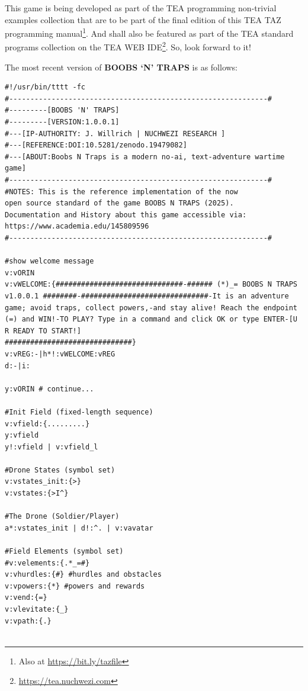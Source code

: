 \documentclass[a4paper, 18pt]{book} %
\begin{document}
\vspace{1em}

This game is being developed as part of the TEA programming non-trivial examples collection that are to be part of the final edition of this TEA TAZ programming manual\footnote{Also at \url{https://bit.ly/tazfile}}. And shall also be featured as part of the TEA standard programs collection on the TEA WEB IDE\footnote{\url{https://tea.nuchwezi.com}}. So, look forward to it!


The most recent version of \textbf{BOOBS `N' TRAPS} is as follows:
 

 {
 \small
  \begin{tcolorbox}[teaterminalstyle, title=TEA Program: BOOBS N TRAPS v1.0.0.1, breakable]
  \begin{lstlisting}[language=TEA,breaklines=true]
#!/usr/bin/tttt -fc
#-------------------------------------------------------------#
#---------[BOOBS 'N' TRAPS]
#---------[VERSION:1.0.0.1]
#---[IP-AUTHORITY: J. Willrich | NUCHWEZI RESEARCH ]
#---[REFERENCE:DOI:10.5281/zenodo.19479082]
#---[ABOUT:Boobs N Traps is a modern no-ai, text-adventure wartime game]
#-------------------------------------------------------------#
#NOTES: This is the reference implementation of the now 
open source standard of the game BOOBS N TRAPS (2025). 
Documentation and History about this game accessible via:
https://www.academia.edu/145809596
#-------------------------------------------------------------#

#show welcome message
v:vORIN
v:vWELCOME:{##############################-###### (*)_= BOOBS N TRAPS v1.0.0.1 ########-##############################-It is an adventure game; avoid traps, collect powers,-and stay alive! Reach the endpoint (=) and WIN!-TO PLAY? Type in a command and click OK or type ENTER-[U R READY TO START!]
##############################}
v:vREG:-|h*!:vWELCOME:vREG
d:-|i:

y:vORIN # continue...

#Init Field (fixed-length sequence)
v:vfield:{.........}
y:vfield
y!:vfield | v:vfield_l

#Drone States (symbol set)
v:vstates_init:{>}
v:vstates:{>I^}

#The Drone (Soldier/Player)
a*:vstates_init | d!:^. | v:vavatar 

#Field Elements (symbol set)
#v:velements:{.*_=#}
v:vhurdles:{#} #hurdles and obstacles
v:vpowers:{*} #powers and rewards
v:vend:{=}
v:vlevitate:{_}
v:vpath:{.}


\end{lstlisting}
\end{tcolorbox}}
\end{document}
